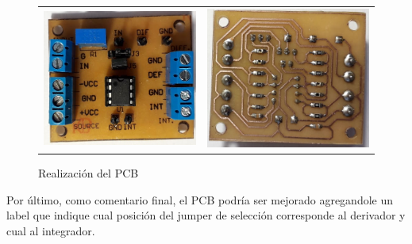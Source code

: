 \begin{figure}[H]
	\centering
	\begin{tabular}{c c}
		\includegraphics[scale=0.55]{Recursos/Altium/OVERLAY_Hecho.png} &
		\includegraphics[scale=0.55]{Recursos/Altium/PCB_Hecho.png}
	\end{tabular}
	\caption{Realizaci\'on del PCB}
	\label{fig:hecho}
\end{figure}

Por \'ultimo, como comentario final, el PCB podr\'ia ser mejorado agregandole un label que indique cual posici\'on del jumper de selecci\'on
corresponde al derivador y cual al integrador.


